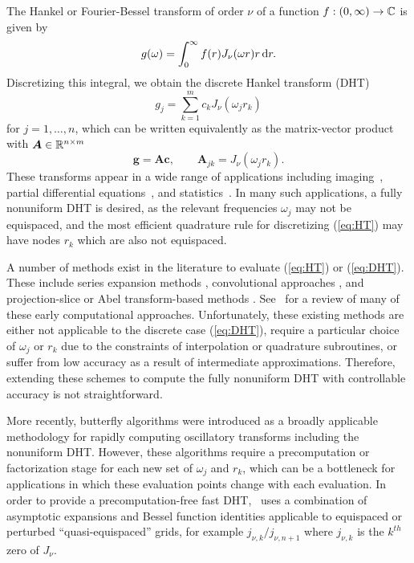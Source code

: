 The Hankel or Fourier-Bessel transform of order $\nu$ of a function $f : (0,
\infty) \to \mathbb{C}$ is given by
\begin{equation} \label{eq:HT}
    g(\omega) = \int_0^\infty f(r) J_\nu(\omega r) r \mathop{}\!\mathrm{d}{r}.
\end{equation}
Discretizing this integral, we obtain the discrete Hankel transform (DHT)
\begin{equation} \label{eq:DHT}
    g_j = \sum_{k=1}^m c_k J_\nu(\omega_j r_k)
\end{equation}
for $j=1, \dots, n$, which can be written equivalently as the matrix-vector
product with $\bm{A} \in \mathbb{R}^{n \times m}$
\begin{equation}
    \bm{g} = \bm{A}\bm{c}, \qquad \bm{A}_{jk} = J_\nu(\omega_j r_k).
\end{equation}
These transforms appear in a wide range of applications including
imaging~\citep{higgins1988hankel, zhao2013fourier}, partial differential
equations~\citep{bisseling1985fast,ali1999generalized}, and
statistics~\cite{lord1954a, genton2002nonparametric}. In many such applications,
a fully nonuniform DHT is desired, as the relevant frequencies $\omega_j$ may
not be equispaced, and the most efficient quadrature rule for discretizing
(\ref{eq:HT}) may have nodes $r_k$ which are also not equispaced.

A number of methods exist in the literature to evaluate (\ref{eq:HT}) or
(\ref{eq:DHT}). These include series expansion methods
\citep{lord1954b,brunol1977fourier,cavanagh1979numerical}, convolutional
approaches \citep{siegman1977quasi, johansen1979fast, mook1983algorithm}, and
projection-slice or Abel transform-based methods
\citep{oppenheim1980computation, hansen1985fast, kapur1995algorithm}.
See~\cite{cree1993algorithms} for a review of many of these early computational
approaches. Unfortunately, these existing methods are either not applicable to
the discrete case (\ref{eq:DHT}), require a particular choice of $\omega_j$ or
$r_k$ due to the constraints of interpolation or quadrature subroutines, or
suffer from low accuracy as a result of intermediate approximations. Therefore,
extending these schemes to compute the fully nonuniform DHT with controllable
accuracy is not straightforward. 

More recently, butterfly algorithms \citep{oneil2010algorithm, li2015butterfly,
pang2020interpolative} were introduced as a broadly applicable methodology for
rapidly computing oscillatory transforms including the nonuniform DHT. However,
these algorithms require a precomputation or factorization stage for each new
set of $\omega_j$ and $r_k$, which can be a bottleneck for applications in which
these evaluation points change with each evaluation. In order to provide a
precomputation-free fast DHT,~\cite{townsend2015fast} uses a combination of
asymptotic expansions and Bessel function identities applicable to equispaced or
perturbed ``quasi-equispaced'' grids, for example $j_{\nu,k} / j_{\nu,n+1}$
where $j_{\nu,k}$ is the $k^{th}$ zero of $J_\nu$.

